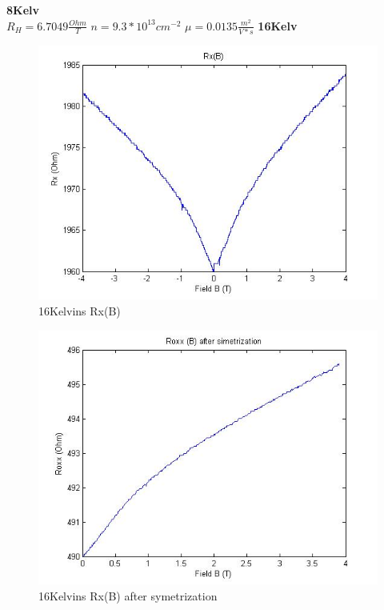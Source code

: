 \documentclass[idxtotoc,hyperref,openany,oneside]{labbook} %
\begin{document}
\normalsize \textbf{8Kelv}\\
$R_H=6.7049 \frac{Ohm}{T}$
\newline
$n=9.3*10^{13} cm^{-2}$
\newline
$\mu=0.0135 \frac{m^2}{V*s}$
\newline
\newline
\newline
\normalsize \textbf{16Kelv}\\
\begin{figure}[H] %
\begin{center}
\includegraphics[width=1\linewidth]{74616kRx(B).jpg}
\end{center}
\caption{16Kelvins Rx(B)}
\label{fig:fig14}
\end{figure}


\begin{figure}[H] %
\begin{center}
\includegraphics[width=1\linewidth]{74616kRox.jpg}
\end{center}
\caption{16Kelvins Rx(B)  after symetrization} 
\label{fig:fig16}
\end{figure}
\end{document}

